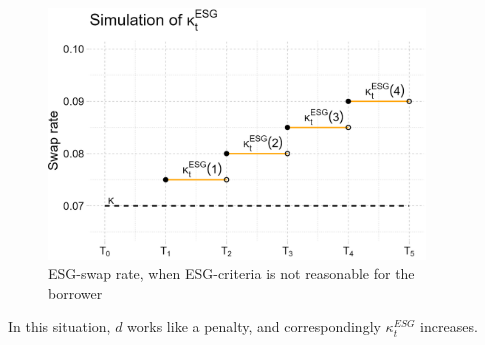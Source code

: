 \begin{figure}[htp]
    \centering
    \includegraphics[width= 10cm]{figures/ESG/kappa_t_ESG_3.png}
    \caption{ESG-swap rate, when ESG-criteria is not reasonable for the borrower}
    \label{fig: ESG_swap_3}
\end{figure}

In this situation, $d$ works like a penalty, and correspondingly $\kappa_{t}^{ESG}$ increases. 

